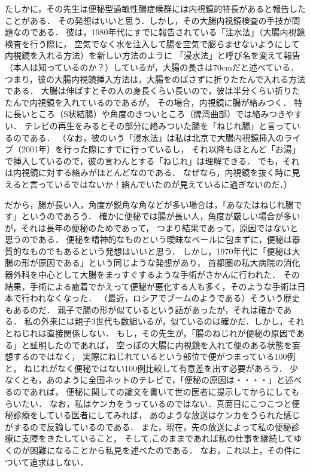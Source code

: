 たしかに，その先生は便秘型過敏性腸症候群には内視鏡的特長があると報告したことがある．
その発想はいいと思う．しかし，その大腸内視鏡検査の手技が問題なのである．
彼は，1980年代にすでに報告されている「注水法」（大腸内視鏡検査を行う際に，
空気でなく水を注入して腸を空気で膨らませないようにして内視鏡を入れる方法）を新しい方法のように
「浸水法」と呼び名を変えて報告（本人は知っているのか？）しているが，大腸の長さは70cmだと述べている．
つまり，彼の大腸内視鏡挿入方法は，大腸をのばさずに折りたたんで入れる方法である．
大腸は伸ばすとその人の身長くらい長いので，彼は半分くらい折りたたんで内視鏡を入れているのであるが，
その場合，内視鏡に腸が絡みつく．
特に長いところ（S状結腸）や角度のきついところ（脾湾曲部）では絡みつきやすい．
テレビの再生をみるとその部分に絡みついた腸を「ねじれ腸」と言っているのである．
（なお，彼のいう「浸水法」は私は北京で大腸内視鏡挿入のライブ（2001年）を行った際にすでに行っているし，
それ以降もほとんど「お湯」で挿入しているので，彼の言わんとする「ねじれ」は理解できる．
でも，それは内視鏡に対する絡みがほとんどなのである．
なぜなら，内視鏡を抜く時に見えると言っているではないか！絡んでいたのが見えているに過ぎないのだ．）

だから，腸が長い人，角度が鋭角な角などが多い場合は，「あなたはねじれ腸です」というのであろう．
確かに便秘では腸が長い人，角度が厳しい場合が多いが，それは長年の便秘のためであって，
つまり結果であって，原因ではないと思うのである．
便秘を精神的なものという曖昧なベールに包まずに，便秘は器質的なものでもあるという発想はいいと思う．
しかし，1970年代に「便秘は大腸の形が原因である」という同じような発想があり，
首都圏の私大病院の消化器外科を中心として大腸をまっすぐするような手術がさかんに行われた．
その結果，手術による癒着でかえって便秘が悪化する人も多く，そのような手術は日本で行われなくなった．
（最近，ロシアでブームのようである）そういう歴史もあるのだ．
親子で腸の形が似ているという話があったが，それは確かである．
私の外来には親子3世代も数組いるが，似ているのは確かだ．しかし，それとねじれは直接関係しない．
もし，その先生が，「腸のねじれが便秘の原因である」と証明したのであれば，
空っぽの大腸に内視鏡を入れて便のある状態を妄想するのではなく，
実際にねじれているという部位で便がつまっている100例と，
ねじれがなく便秘ではない100例比較して有意差を出す必要があろう．
少なくとも，あのように全国ネットのテレビで，「便秘の原因は・・・・」と述べるのであれば，
便秘に関しての論文を書いて世の医者に提示してからにしてもらいたい．
なお，私はケンカをうっているのではない．真面目にこつこつと便秘診療をしている医者にしてみれば，
あのような放送はケンカをうられた感じがするので反論しているのである．
また，現在，先の放送によって私の便秘診療に支障をきたしていること，
そして,このままであれば私の仕事を継続してゆくのが困難になることから私見を述べたのである．
なお，これ以上，その件について追求はしない． 

